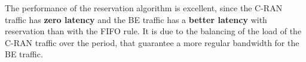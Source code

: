 \documentclass[10pt, conference, letterpaper]{IEEEtran}
\begin{document}
  The performance of the reservation algorithm is excellent, since the C-RAN traffic has {\bf zero latency} and the BE traffic has a \textbf{better latency} with reservation than with the FIFO rule. It is due to the balancing of the load of the C-RAN traffic over the period, that guarantee a more regular bandwidth for the BE traffic.
  

  
  

\end{document}
